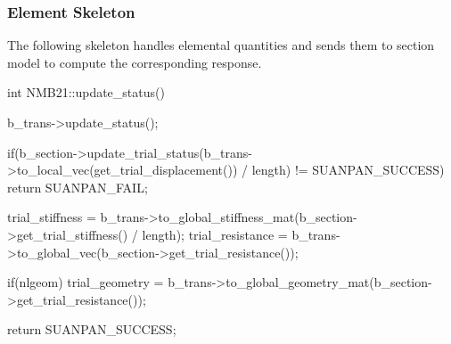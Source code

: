 \subsubsection{Element Skeleton}
The following skeleton handles elemental quantities and sends them to section model to compute the corresponding response.
\begin{cppcode}
int NMB21::update_status() {
    b_trans->update_status();

    if(b_section->update_trial_status(b_trans->to_local_vec(get_trial_displacement()) / length) != SUANPAN_SUCCESS) return SUANPAN_FAIL;

    trial_stiffness = b_trans->to_global_stiffness_mat(b_section->get_trial_stiffness() / length);
    trial_resistance = b_trans->to_global_vec(b_section->get_trial_resistance());

    if(nlgeom) trial_geometry = b_trans->to_global_geometry_mat(b_section->get_trial_resistance());

    return SUANPAN_SUCCESS;
}
\end{cppcode}
